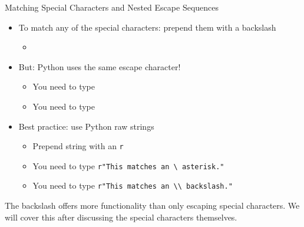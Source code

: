 \begin{frame}{Matching Special Characters and Nested Escape Sequences}
%
\begin{itemize}
\item To match any of the special characters: prepend them with a backslash
	\begin{itemize}
	\item[\Thus] 
	\end{itemize}
\pause
\item But: Python uses the same escape character!
	\begin{itemize}
	\item[\Thus] You need to type 
	\item[\Thus] You need to type 
	\end{itemize}
\pause
\item Best practice: use Python raw strings
	\begin{itemize}
	\item Prepend string with an \texttt{r}
	\item [\Thus] You need to type \texttt{{\color{purple}r}"{\color{olive}This matches an {\color{purple}\textbackslash*} asterisk.}"}
	\item [\Thus] You need to type \texttt{{\color{purple}r}"{\color{olive}This matches an {\color{purple}\textbackslash\textbackslash} backslash.}"}
	\end{itemize}
\end{itemize}
%
\pause
\begin{hintbox}
\footnotesize
The backslash offers more functionality than only escaping special characters. We will cover this after discussing the special characters themselves.
\end{hintbox}
%
\end{frame}


